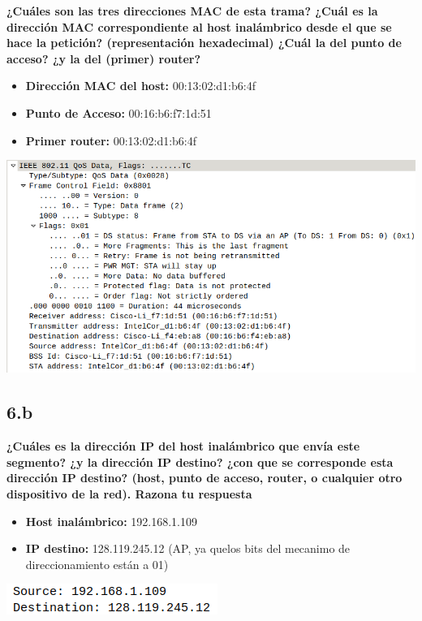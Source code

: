 \documentclass{article}
\begin{document}
\textbf{¿Cuáles son las tres direcciones MAC de esta trama? ¿Cuál es la dirección MAC
correspondiente al host inalámbrico desde el que se hace la petición? (representación
hexadecimal) ¿Cuál la del punto de acceso? ¿y la del (primer) router?}

\begin{itemize}
\item \textbf{Dirección MAC del host:} 00:13:02:d1:b6:4f
\item \textbf{Punto de Acceso:} 00:16:b6:f7:1d:51
\item \textbf{Primer router:} 00:13:02:d1:b6:4f
\end{itemize}

\begin{center}
\includegraphics[scale=0.4]{WLAN/MAC.png}
\end{center}

\subsection{6.b}

\textbf{¿Cuáles es la dirección IP del host inalámbrico que envía este segmento? ¿y la dirección IP destino? ¿con que se corresponde esta dirección IP destino? (host, punto de acceso, router, o cualquier otro dispositivo de la red). Razona tu respuesta}

\begin{itemize}
\item \textbf{Host inalámbrico:} 192.168.1.109
\item \textbf{IP destino:} 128.119.245.12 (AP, ya quelos bits del mecanimo de direccionamiento están a 01)
\end{itemize}

\begin{center}
\includegraphics[scale=0.4]{WLAN/IP.png}
\end{center}
\end{document}
